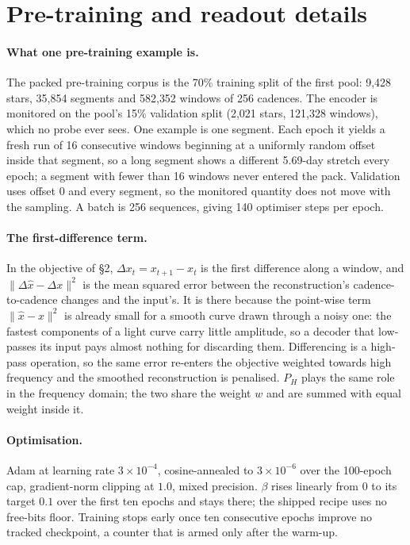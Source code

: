 \documentclass{article}
\begin{document}
\raggedbottom



\appendix

\section{Pre-training and readout details}
\label{app:training}

\paragraph{What one pre-training example is.} The packed pre-training corpus is the 70\% training
split of the first pool: 9{,}428 stars, 35{,}854 segments and 582{,}352 windows of 256 cadences. The
encoder is monitored on the pool's 15\% validation split (2{,}021 stars, 121{,}328 windows), which no
probe ever sees. One example is one segment. Each epoch it yields a fresh run of 16 consecutive
windows beginning at a uniformly random offset inside that segment, so a long segment shows a
different 5.69-day stretch every epoch; a segment with fewer than 16 windows never entered the pack.
Validation uses offset 0 and every segment, so the monitored quantity does not move with the
sampling. A batch is 256 sequences, giving 140 optimiser steps per epoch.

\paragraph{The first-difference term.} In the objective of \S2, $\Delta x_{t} = x_{t+1} - x_{t}$ is
the first difference along a window, and $\|\Delta\hat{x}-\Delta x\|^{2}$ is the mean squared error
between the reconstruction's cadence-to-cadence changes and the input's. It is there because the
point-wise term $\|\hat{x}-x\|^{2}$ is already small for a smooth curve drawn through a noisy one:
the fastest components of a light curve carry little amplitude, so a decoder that low-passes its
input pays almost nothing for discarding them. Differencing is a high-pass operation, so the same
error re-enters the objective weighted towards high frequency and the smoothed reconstruction is
penalised. $P_{H}$ plays the same role in the frequency domain; the two share the weight $w$ and are
summed with equal weight inside it.

\paragraph{Optimisation.} Adam at learning rate $3\times10^{-4}$, cosine-annealed to
$3\times10^{-6}$ over the 100-epoch cap, gradient-norm clipping at $1.0$, mixed precision. $\beta$
rises linearly from $0$ to its target $0.1$ over the first ten epochs and stays there; the shipped
recipe uses no free-bits floor. Training stops early once ten consecutive epochs improve no tracked
checkpoint, a counter that is armed only after the warm-up.
\end{document}
